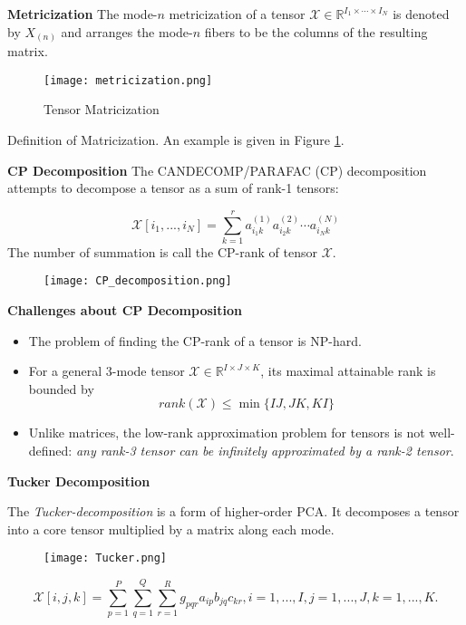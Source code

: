 {\bf Metricization}
The mode-$n$ metricization of a tensor $\mathcal{X}\in\mathbb{R}^{I_1\times\cdots\times I_N}$ is denoted by $X_{(n)}$ and arranges the mode-$n$ fibers to be the columns of the resulting matrix.
\begin{figure}[ht]\label{fmat}
\centering
\texttt{[image: metricization.png]}
\caption{Tensor Matricization}
\end{figure}
{\color{red} Definition of Matricization}. An example is given in Figure \ref{fmat}.

{\bf CP Decomposition}
The CANDECOMP/PARAFAC (CP) decomposition attempts to decompose a tensor as a sum of rank-1 tensors:

\begin{equation}
\mathcal{X}[i_1,...,i_N] = \sum_{k=1}^r a^{(1)}_{i_1k}a^{(2)}_{i_2k}\cdots a^{(N)}_{i_Nk}
\end{equation}
The number of summation is call the CP-rank of tensor $\mathcal{X}$.
\begin{figure}[ht]
\centering
\texttt{[image: CP\_decomposition.png]}
\end{figure}

{\bf Challenges about CP Decomposition}
\begin{itemize}
\item
The problem of finding the CP-rank of a tensor is NP-hard.
\item
For a general 3-mode tensor $\mathcal{X}\in\mathbb{R}^{I\times J\times K}$, its maximal attainable rank is bounded by
$$
rank(\mathcal{X})\le \min\{IJ, JK, KI\}
$$
\item
Unlike matrices, the low-rank approximation problem for tensors is not well-defined: \textit{any rank-3 tensor can be infinitely approximated by a rank-2 tensor}.
\end{itemize}

{\bf Tucker Decomposition}

The \textit{Tucker-decomposition} is a form of higher-order PCA. It decomposes a tensor into a core tensor multiplied by a matrix along each mode.
\begin{figure}[ht]
\centering
\texttt{[image: Tucker.png]}
\end{figure}
\begin{equation}
\mathcal{X}[i,j,k] = \sum_{p=1}^P\sum_{q=1}^Q\sum_{r=1}^R
g_{pqr}a_{ip}b_{jq}c_{kr}, i=1,...,I, j=1,...,J, k=1,...,K.
\end{equation}

